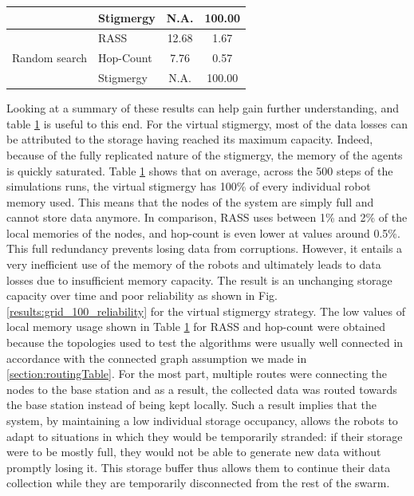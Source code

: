 \begin{table}[htbp]
\begin{tabular}{|l|l|c|c|}
                                      & Stigmergy                              & N.A.                                                                      & 100.00                                                               \\ \hline
\multirow{3}{*}{Random search}        & \ac{RASS}                                   & 12.68                                                                     & 1.67                                                                 \\
                                      & Hop-Count                              & 7.76                                                                      & 0.57                                                                 \\
                                      & Stigmergy                              & N.A.                                                                      & 100.00                                                               \\
\hline
\end{tabular}
\label{table:speed}
\end{table}

Looking at a summary of these results can help gain further understanding, and table \ref{table:speed} is useful to this end. For the virtual stigmergy, most of the data losses can be attributed to the storage having reached its maximum capacity. Indeed, because of the fully replicated nature of the stigmergy, the memory of the agents is quickly saturated. Table \ref{table:speed} shows that on average, across the 500 steps of the simulations runs, the virtual stigmergy has 100\% of every individual robot memory used. This means that the nodes of the system are simply full and cannot store data anymore. In comparison, \ac{RASS} uses between 1\% and 2\% of the local memories of the nodes, and hop-count is even lower at values around 0.5\%. This full redundancy prevents losing data from corruptions. However, it entails a very inefficient use of the memory of the robots and ultimately leads to data losses due to insufficient memory capacity. The result is an unchanging storage capacity over time and poor reliability as shown in Fig. \ref{results:grid_100_reliability} for the virtual stigmergy strategy. The low values of local memory usage shown in Table \ref{table:speed} for \ac{RASS} and hop-count were obtained because the topologies used to test the algorithms were usually well connected in accordance with the connected graph assumption we made in \ref{section:routingTable}. For the most part, multiple routes were connecting the nodes to the base station and as a result, the collected data was routed towards the base station instead of being kept locally. Such a result implies that the system, by maintaining a low individual storage occupancy, allows the robots to adapt to situations in which they would be temporarily stranded: if their storage were to be mostly full, they would not be able to generate new data without promptly losing it. This storage buffer thus allows them to continue their data collection while they are temporarily disconnected from the rest of the swarm.

